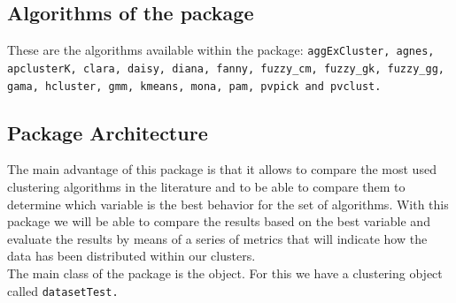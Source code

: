 \subsection{Algorithms of the package}
These are the algorithms available within the package: \texttt{aggExCluster, agnes, apclusterK, clara, daisy, diana, fanny, fuzzy\_cm, fuzzy\_gk, fuzzy\_gg, gama, hcluster, gmm, kmeans, mona, pam, pvpick and pvclust.}

\subsection{Package Architecture}

The main advantage of this package is that it allows to compare the most used clustering algorithms in the literature and to be able to compare them to determine which variable is the best behavior for the set of algorithms. With this package we will be able to compare the results based on the best variable and evaluate the results by means of a series of metrics that will indicate how the data has been distributed within our clusters.
\\
The main class of the package is the  object. For this we have a clustering object called \texttt{datasetTest.}
